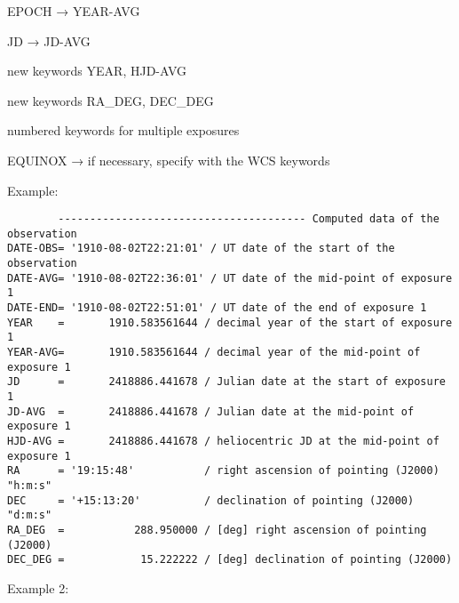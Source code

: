\documentclass[11pt]{ivoa}
\begin{document}
EPOCH → YEAR-AVG

JD → JD-AVG

new keywords YEAR, HJD-AVG

new keywords RA\_DEG, DEC\_DEG

numbered keywords for multiple exposures

EQUINOX → if necessary, specify with the WCS keywords

Example:

\begin{lstlisting}
        --------------------------------------- Computed data of the observation
DATE-OBS= '1910-08-02T22:21:01' / UT date of the start of the observation
DATE-AVG= '1910-08-02T22:36:01' / UT date of the mid-point of exposure 1
DATE-END= '1910-08-02T22:51:01' / UT date of the end of exposure 1
YEAR    =       1910.583561644 / decimal year of the start of exposure 1
YEAR-AVG=       1910.583561644 / decimal year of the mid-point of exposure 1
JD      =       2418886.441678 / Julian date at the start of exposure 1
JD-AVG  =       2418886.441678 / Julian date at the mid-point of exposure 1
HJD-AVG =       2418886.441678 / heliocentric JD at the mid-point of exposure 1
RA      = '19:15:48'           / right ascension of pointing (J2000) "h:m:s"
DEC     = '+15:13:20'          / declination of pointing (J2000) "d:m:s"
RA_DEG  =           288.950000 / [deg] right ascension of pointing (J2000)
DEC_DEG =            15.222222 / [deg] declination of pointing (J2000)
\end{lstlisting}

Example 2:
\end{document}
